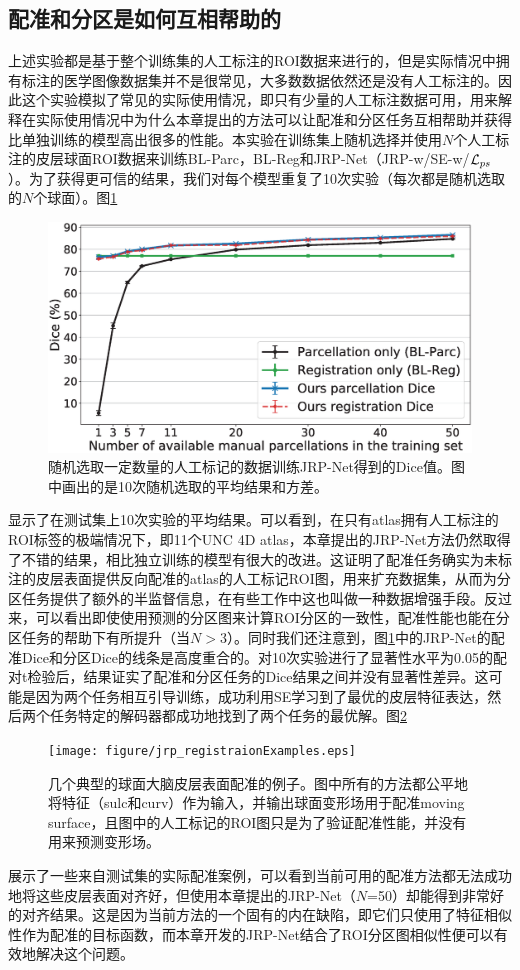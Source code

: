 \subsection{配准和分区是如何互相帮助的}
上述实验都是基于整个训练集的人工标注的ROI数据来进行的，但是实际情况中拥有标注的医学图像数据集并不是很常见，大多数数据依然还是没有人工标注的。因此这个实验模拟了常见的实际使用情况，即只有少量的人工标注数据可用，用来解释在实际使用情况中为什么本章提出的方法可以让配准和分区任务互相帮助并获得比单独训练的模型高出很多的性能。本实验在训练集上随机选择并使用$N$个人工标注的皮层球面ROI数据来训练BL-Parc，BL-Reg和JRP-Net（JRP-w/SE-w/${\cal L}_{ps}$）。为了获得更可信的结果，我们对每个模型重复了10次实验（每次都是随机选取的$N$个球面）。图\ref{fig:jrp_dice}
\begin{figure}[h]
	\centering
	\includegraphics[width=0.7\linewidth]{figure/jrp_Figure_dice.eps}
	\caption{随机选取一定数量的人工标记的数据训练JRP-Net得到的Dice值。图中画出的是10次随机选取的平均结果和方差。} \label{fig:jrp_dice}
\end{figure}
显示了在测试集上10次实验的平均结果。可以看到，在只有atlas拥有人工标注的ROI标签的极端情况下，即11个UNC 4D atlas\cite{li2015construction}，本章提出的JRP-Net方法仍然取得了不错的结果，相比独立训练的模型有很大的改进。这证明了配准任务确实为未标注的皮层表面提供反向配准的atlas的人工标记ROI图，用来扩充数据集，从而为分区任务提供了额外的半监督信息，在有些工作\cite{xu2019deepatlas}中这也叫做一种数据增强手段。反过来，可以看出即使使用预测的分区图来计算ROI分区的一致性，配准性能也能在分区任务的帮助下有所提升（当$N>3$）。同时我们还注意到，图\ref{fig:jrp_dice}中的JRP-Net的配准Dice和分区Dice的线条是高度重合的。对10次实验进行了显著性水平为0.05的配对t检验后，结果证实了配准和分区任务的Dice结果之间并没有显著性差异。这可能是因为两个任务相互引导训练，成功利用SE学习到了最优的皮层特征表达，然后两个任务特定的解码器都成功地找到了两个任务的最优解。图\ref{fig:jrp_registraionExamples}
\begin{figure}[h]
	\centering
	\texttt{[image: figure/jrp\_registraionExamples.eps]}
	\caption{几个典型的球面大脑皮层表面配准的例子。图中所有的方法都公平地将特征（sulc和curv）作为输入，并输出球面变形场用于配准moving surface，且图中的人工标记的ROI图只是为了验证配准性能，并没有用来预测变形场。} \label{fig:jrp_registraionExamples}
\end{figure}
展示了一些来自测试集的实际配准案例，可以看到当前可用的配准方法都无法成功地将这些皮层表面对齐好，但使用本章提出的JRP-Net（$N$=50）却能得到非常好的对齐结果。这是因为当前方法的一个固有的内在缺陷，即它们只使用了特征相似性作为配准的目标函数，而本章开发的JRP-Net结合了ROI分区图相似性便可以有效地解决这个问题。

